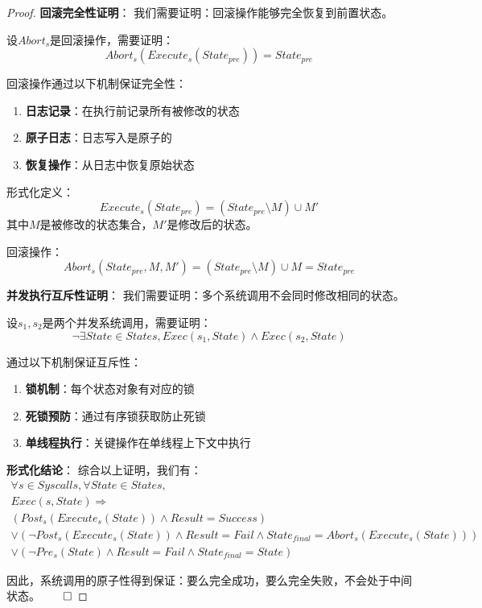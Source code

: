 \documentclass{article}
\theoremstyle{definition}
\theoremstyle{remark}
\begin{document}
\begin{proof}
    \textbf{回滚完全性证明}：
    我们需要证明：回滚操作能够完全恢复到前置状态。

    设$Abort_s$是回滚操作，需要证明：
    \[
    Abort_s(Execute_s(State_{pre})) = State_{pre}
    \]

    回滚操作通过以下机制保证完全性：
    \begin{enumerate}
        \item \textbf{日志记录}：在执行前记录所有被修改的状态
        \item \textbf{原子日志}：日志写入是原子的
        \item \textbf{恢复操作}：从日志中恢复原始状态
    \end{enumerate}

    形式化定义：
    \[
    Execute_s(State_{pre}) = (State_{pre} \setminus M) \cup M'
    \]
    其中$M$是被修改的状态集合，$M'$是修改后的状态。

    回滚操作：
    \[
    Abort_s(State_{pre}, M, M') = (State_{pre} \setminus M) \cup M = State_{pre}
    \]

    \textbf{并发执行互斥性证明}：
    我们需要证明：多个系统调用不会同时修改相同的状态。

    设$s_1, s_2$是两个并发系统调用，需要证明：
    \[
    \neg \exists State \in States, Exec(s_1, State) \land Exec(s_2, State)
    \]

    通过以下机制保证互斥性：
    \begin{enumerate}
        \item \textbf{锁机制}：每个状态对象有对应的锁
        \item \textbf{死锁预防}：通过有序锁获取防止死锁
        \item \textbf{单线程执行}：关键操作在单线程上下文中执行
    \end{enumerate}

    \textbf{形式化结论}：
    综合以上证明，我们有：
    \begin{align*}
        \forall s \in Syscalls, \forall State \in States, \\
        Exec(s, State) \Rightarrow \\
        (Post_s(Execute_s(State)) \land Result = Success) \\
        \lor (\neg Post_s(Execute_s(State)) \land Result = Fail \land State_{final} = Abort_s(Execute_s(State))) \\
        \lor (\neg Pre_s(State) \land Result = Fail \land State_{final} = State)
    \end{align*}

    因此，系统调用的原子性得到保证：要么完全成功，要么完全失败，不会处于中间状态。$\qed$
\end{proof}
\end{document}
